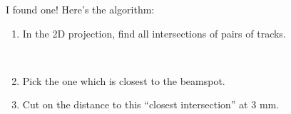 \begin{slide*}

\slideframe{}
\huge
{}

\begin{minipage}[t]{\linewidth}
\LARGE

I found one! Here's the algorithm:

\begin{enumerate}
  \item In the 2D projection, find all intersections of pairs of tracks.

\begin{center}
   \\
\end{center}

  \item Pick the one which is closest to the beamspot.

  \item Cut on the distance to this ``closest intersection'' at 3 mm.

\end{enumerate}

\end{minipage}

\end{slide*}


\begin{slide*}

\slideframe{}
\huge
{}

\begin{minipage}[t]{\linewidth}
\LARGE

\vspace{1 in}

\begin{center}
   \\
\end{center}

\end{minipage}

\end{slide*}


